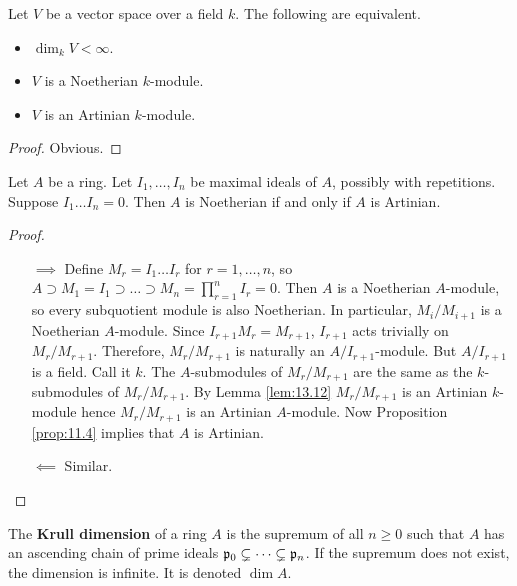 \pagebreak

\begin{lemma}
\label{lem:13.12}
Let $ V $ be a vector space over a field $ k $. The following are equivalent.
\begin{itemize}
\item $ \dim_k V < \infty $.
\item $ V $ is a Noetherian $ k $-module.
\item $ V $ is an Artinian $ k $-module.
\end{itemize}
\end{lemma}

\begin{proof}
Obvious.
\end{proof}

\begin{lemma}
\label{lem:13.13}
Let $ A $ be a ring. Let $ I_1, \dots, I_n $ be maximal ideals of $ A $, possibly with repetitions. Suppose $ I_1 \dots I_n = 0 $. Then $ A $ is Noetherian if and only if $ A $ is Artinian.
\end{lemma}

\begin{proof}
\hfill
\begin{itemize}
\item[$ \implies $] Define $ M_r = I_1 \dots I_r $ for $ r = 1, \dots, n $, so $ A \supset M_1 = I_1 \supset \dots \supset M_n = \prod_{r = 1}^n I_r = 0 $. Then $ A $ is a Noetherian $ A $-module, so every subquotient module is also Noetherian. In particular, $ M_i / M_{i + 1} $ is a Noetherian $ A $-module. Since $ I_{r + 1}M_r = M_{r + 1} $, $ I_{r + 1} $ acts trivially on $ M_r / M_{r + 1} $. Therefore, $ M_r / M_{r + 1} $ is naturally an $ A / I_{r + 1} $-module. But $ A / I_{r + 1} $ is a field. Call it $ k $. The $ A $-submodules of $ M_r / M_{r + 1} $ are the same as the $ k $-submodules of $ M_r / M_{r + 1} $. By Lemma \ref{lem:13.12} $ M_r / M_{r + 1} $ is an Artinian $ k $-module hence $ M_r / M_{r + 1} $ is an Artinian $ A $-module. Now Proposition \ref{prop:11.4} implies that $ A $ is Artinian.
\item[$ \impliedby $] Similar.
\end{itemize}
\end{proof}

\begin{definition}
The \textbf{Krull dimension} of a ring $ A $ is the supremum of all $ n \ge 0 $ such that $ A $ has an ascending chain of prime ideals $ \mathfrak{p}_0 \subsetneq \dots \subsetneq \mathfrak{p}_n $. If the supremum does not exist, the dimension is infinite. It is denoted $ \dim A $.
\end{definition}

